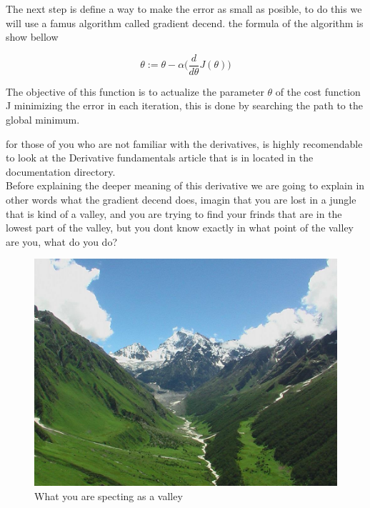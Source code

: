 \documentclass[12pt,journal]{IEEEtran}
\begin{document}
    The next step is define a way to make the error as small as posible,
    to do this we will use a famus algorithm called gradient decend.
    the formula of the algorithm is show bellow

    \begin{equation}
        \theta := \theta - \alpha
            \Bigg(
                \frac{d}{d \theta} J(\theta)
            \Bigg)
    \end{equation}

    The objective of this function is to actualize the parameter $\theta$
    of the cost function J minimizing the error in each iteration, this
    is done by searching the path to the global minimum.

    for those of you who are not familiar with the derivatives, is highly
    recomendable to look at the Derivative fundamentals article that is in
    located in the documentation directory.\\

    Before explaining the deeper meaning of this derivative we are going to
    explain in other words what the gradient decend does, imagin that you are
    lost in a jungle that is kind of a valley, and you are trying to find your
    frinds that are in the lowest part of the valley, but you dont know exactly
    in what point of the valley are you, what do you do?\\


    \vspace{2cm}

    \begin{figure}[h]
        \centering
        \includegraphics[scale=0.2]{Valley}
        \caption{What you are specting as a valley}
    \end{figure}
\end{document}
